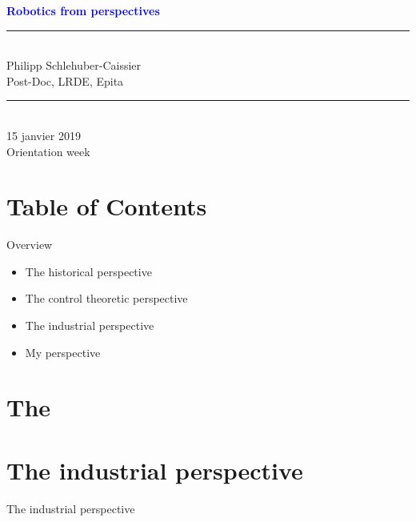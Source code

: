 \documentclass[usenames,dvipsnames,xcolor=table]{beamer}
\date{\today} %
\begin{document}
\begin{frame}
\begin{center}
    \textcolor{blue}{
    \textbf{
    {\Large
    Robotics from perspectives\\[4pt]
    }}
    }
    \rule{.9\linewidth}{2pt}\\[4pt]
    Philipp Schlehuber-Caissier \\
    Post-Doc, LRDE, Epita\\[6pt]
    \rule{.9\linewidth}{2pt}\\[4pt]
 	15 janvier 2019\\
    Orientation week
    
\end{center}
\end{frame}


\section{Table of Contents}

\begin{frame}{Overview}
    \begin{itemize}
        \item The historical perspective
        \item The control theoretic perspective
        \item The industrial perspective
        \item My perspective
    \end{itemize}
\end{frame}

\section{The}

\section{The industrial perspective}
\begin{frame}{The industrial perspective}
\begin{center}
    
\end{center}
\end{frame}
\end{document}
